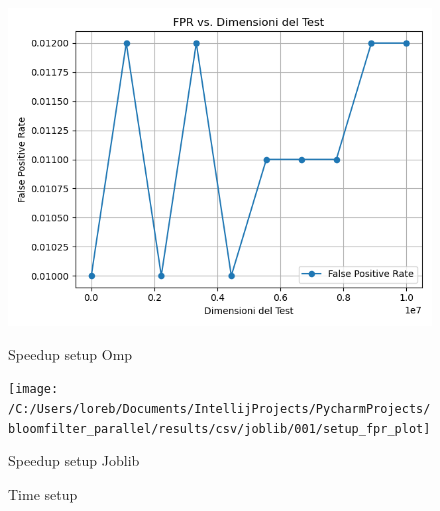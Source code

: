 \documentclass[11pt]{article}
\begin{document}
    \begin{figure}[H]
        \centering
        \includegraphics[width=\linewidth]{omp/001/setup_fpr_plot}
            \caption{Speedup setup Omp}\label{fig:setup_fpr_omp}
        \endminipage\hfill
        \texttt{[image: /C:/Users/loreb/Documents/IntellijProjects/PycharmProjects/bloomfilter\_parallel/results/csv/joblib/001/setup\_fpr\_plot]}
            \caption{Speedup setup Joblib}\label{fig:setup_fpr_joblib}
        \endminipage\hfill
        \caption{Time setup}
    \end{figure}
\end{document}
